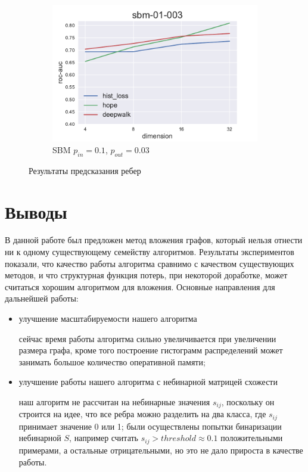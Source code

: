 \documentclass[12pt,a4paper]{extarticle}
\begin{document}
\begin{figure}
\begin{subfigure}{.5\linewidth}
    \includegraphics[width=\linewidth]{src/images/Link_prediction_sbm-01-003.pdf}
    \caption{SBM $p_{in}=0.1$, $p_{out}=0.03$}
    \label{fig:lp_sbm2}
    \end{subfigure}
    \caption{Результаты предсказания ребер}
    \label{fig:lp}
    \end{figure}
    
    \section{Выводы}
    
    В данной работе был предложен метод вложения графов, который нельзя отнести ни к одному существующему семейству алгоритмов. Результаты экспериментов показали, что качество работы алгоритма сравнимо с качеством существующих методов, и что структурная функция потерь, при некоторой доработке, может считаться хорошим алгоритмом для вложения. Основные направления для дальнейшей работы: 
    \begin{itemize}
    \item улучшение масштабируемости нашего алгоритма
    
    сейчас время работы алгоритма сильно увеличивается при увеличении размера графа, кроме того построение гистограмм распределений может занимать большое количество оперативной памяти; 
    \item улучшение работы нашего алгоритма с небинарной матрицей схожести
    
    наш алгоритм не рассчитан на небинарные значения $s_{ij}$, поскольку он строится на идее, что все ребра можно разделить на два класса, где $s_{ij}$ принимает значение 0 или 1; были осуществлены попытки бинаризации небинарной $S$, например считать $s_{ij} > threshold \approx 0.1$ положительными примерами, а остальные отрицательными, но это не дало прироста в качестве работы.
    \end{itemize}
    
    
    
\end{document}

